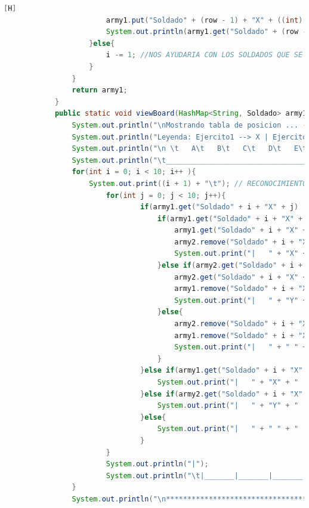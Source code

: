 \documentclass{article}
\begin{document}
\begin{lstlisting}[language=java,caption={Las lineas de codigos del metodo creado:}][H]
						army1.put("Soldado" + (row - 1) + "X" + ((int)(column.charAt(0)) - 65), new Soldado(name, health, row, column)); //INTEGRAMOS AL HASHMAP AL SOLDADO CON SU RESPECTIVO NOMBRE Y VALOR 
						System.out.println(army1.get("Soldado" + (row - 1) + "X" + ((int)(column.charAt(0)) - 65)).toString()); //PUBLICAMOS AL SOLDADO CREADO POR ORDEN DE CREACION
					}else{
						i -= 1; //NOS AYUDARIA CON LOS SOLDADOS QUE SE REPITEN EN EL MISMO CASILLERO CON TAL QUE NO DEBERIA CONTAR 
					}
				}
				return army1;
			}
			public static void viewBoard(HashMap<String, Soldado> army1, HashMap<String, Soldado> army2){ //EN ESTE METODO DEMOSTRAREMOS LA TABLA REUTILIZAREMOS CODIGOS DE ANTERIORES LABORATORIOS PARA PODER HACER LA BASE DE ESTE TABLERO
				System.out.println("\nMostrando tabla de posicion ... --");
				System.out.println("Leyenda: Ejercito1 --> X | Ejercito2 --> Y"); //RECONOCIMIENTO PARA LOS EJERCITOS Y POSICION DE SUS SOLDADOS
				System.out.println("\n \t   A\t   B\t   C\t   D\t   E\t   F\t   G\t   H\t   I\t   J"); // RECONOCIMIENTO PARA CADA UBICACION DE CADA SOLDADO EN EL TABLERO POR PARTE DE LAS COLUMNAS
				System.out.println("\t_________________________________________________________________________________");
				for(int i = 0; i < 10; i++ ){
					System.out.print((i + 1) + "\t"); // RECONOCIMIENTO PARA CADA UBICACION DE CADA SOLDADO EN EL TABLERO POR PARTE DE LAS FILAS
						for(int j = 0; j < 10; j++){
								if(army1.get("Soldado" + i + "X" + j) != null && army2.get("Soldado" + i + "X" + j) != null){ //CREAMOS UN IF PARA QUE ESTE NOS AYUDE A SABER QUIEN DE ESTOS SOLDADOS SE OCUPARA DEL CASILLERO EL CUAL DONDE ESTAN PELEANDO
									if(army1.get("Soldado" + i + "X" + j).getHealth() > army2.get("Soldado" + i + "X" + j).getHealth()){
										army1.get("Soldado" + i + "X" + j).setHealth(army1.get("Soldado" + i + "X" + j).getHealth() - army2.get("Soldado" + i + "X" + j).getHealth());
										army2.remove("Soldado" + i + "X" + j);
										System.out.print("|   " + "X" + "   ");
									}else if(army2.get("Soldado" + i + "X" + j) != null && army1.get("Soldado" + i + "X" + j) != null){
										army2.get("Soldado" + i + "X" + j).setHealth(army2.get("Soldado" + i + "X" + j).getHealth() - army1.get("Soldado" + i + "X" + j).getHealth());
										army1.remove("Soldado" + i + "X" + j);
										System.out.print("|   " + "Y" + "   ");
									}else{
										army2.remove("Soldado" + i + "X" + j);
										army1.remove("Soldado" + i + "X" + j);
										System.out.print("|   " + " " + "   ");
									}
								}else if(army1.get("Soldado" + i + "X" + j) != null){
									System.out.print("|   " + "X" + "   ");
								}else if(army2.get("Soldado" + i + "X" + j) != null){
									System.out.print("|   " + "Y" + "   ");
								}else{
									System.out.print("|   " + " " + "   ");
								}
						}
						System.out.println("|");
						System.out.println("\t|_______|_______|_______|_______|_______|_______|_______|_______|_______|_______|");
				}
				System.out.println("\n*********************************");
			

\end{lstlisting}
\end{document}
